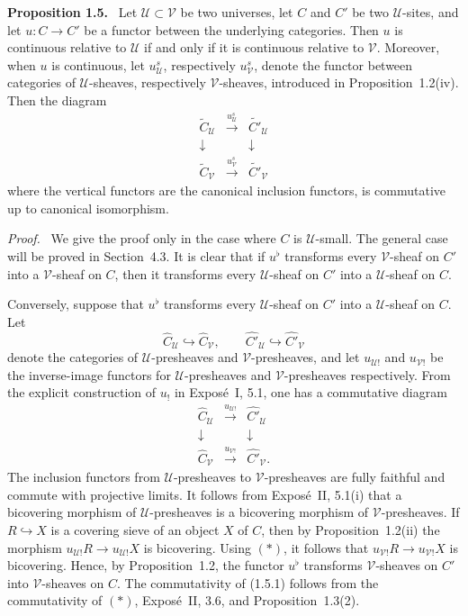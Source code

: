 \documentclass[11pt]{article}
\newcommand{\U}{\mathcal{U}}
\newcommand{\V}{\mathcal{V}}
\newenvironment{statement}[1]{\par\medskip\noindent\textbf{#1.}\ }{\par\medskip}
\newenvironment{prooftext}{\par\noindent\emph{Proof.}\ }{\par\medskip}
\begin{document}
\begin{statement}{Proposition 1.5}
Let \(\U\subset\V\) be two universes, let \(C\) and \(C'\) be two \(\U\)-sites, and let \(u:C\to C'\) be a functor between the underlying categories. Then \(u\) is continuous relative to \(\U\) if and only if it is continuous relative to \(\V\). Moreover, when \(u\) is continuous, let \(u^s_{\U}\), respectively \(u^s_{\V}\), denote the functor between categories of \(\U\)-sheaves, respectively \(\V\)-sheaves, introduced in Proposition~1.2(iv). Then the diagram
\[
\begin{array}{ccc}
\widetilde C_{\U}&\xrightarrow{u^s_{\U}}&\widetilde{C'}_{\U}\\
\downarrow&&\downarrow\\
\widetilde C_{\V}&\xrightarrow{u^s_{\V}}&\widetilde{C'}_{\V}
\end{array}\tag{1.5.1}
\]
where the vertical functors are the canonical inclusion functors, is commutative up to canonical isomorphism.
\end{statement}

\begin{prooftext}
We give the proof only in the case where \(C\) is \(\U\)-small. The general case will be proved in Section~4.3. It is clear that if \(u^\flat\) transforms every \(\V\)-sheaf on \(C'\) into a \(\V\)-sheaf on \(C\), then it transforms every \(\U\)-sheaf on \(C'\) into a \(\U\)-sheaf on \(C\).

Conversely, suppose that \(u^\flat\) transforms every \(\U\)-sheaf on \(C'\) into a \(\U\)-sheaf on \(C\). Let
\[
\widehat C_{\U}\hookrightarrow\widehat C_{\V},
\qquad
\widehat{C'}_{\U}\hookrightarrow\widehat{C'}_{\V}
\]
denote the categories of \(\U\)-presheaves and \(\V\)-presheaves, and let \(u_{\U!}\) and \(u_{\V!}\) be the inverse-image functors for \(\U\)-presheaves and \(\V\)-presheaves respectively. From the explicit construction of \(u_!\) in Expos\'e~I, 5.1, one has a commutative diagram
\[
\begin{array}{ccc}
\widehat C_{\U}&\xrightarrow{u_{\U!}}&\widehat{C'}_{\U}\\
\downarrow&&\downarrow\\
\widehat C_{\V}&\xrightarrow{u_{\V!}}&\widehat{C'}_{\V}.
\end{array}\tag{*}
\]
The inclusion functors from \(\U\)-presheaves to \(\V\)-presheaves are fully faithful and commute with projective limits. It follows from Expos\'e~II, 5.1(i) that a bicov\-ering morphism of \(\U\)-presheaves is a bicov\-ering morphism of \(\V\)-presheaves. If \(R\hookrightarrow X\) is a covering sieve of an object \(X\) of \(C\), then by Proposition~1.2(ii) the morphism \(u_{\U!}R\to u_{\U!}X\) is bicov\-ering. Using \((*)\), it follows that \(u_{\V!}R\to u_{\V!}X\) is bicov\-ering. Hence, by Proposition~1.2, the functor \(u^\flat\) transforms \(\V\)-sheaves on \(C'\) into \(\V\)-sheaves on \(C\). The commutativity of (1.5.1) follows from the commutativity of \((*)\), Expos\'e~II, 3.6, and Proposition~1.3(2).
\end{prooftext}
\end{document}
